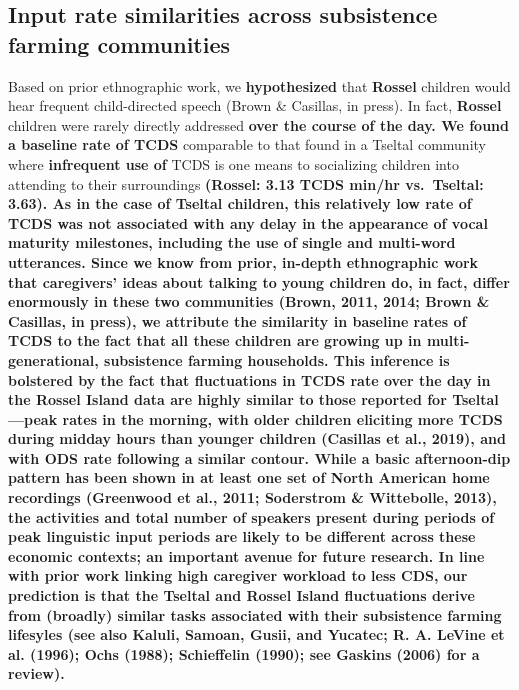 \documentclass[,man,floatsintext]{apa6}
\begin{document}
\subsection{\texorpdfstring{\textbf{Input rate similarities across
subsistence farming
communities}}{Input rate similarities across subsistence farming communities}}\label{input-rate-similarities-across-subsistence-farming-communities}

Based on prior ethnographic work, we \textbf{hypothesized} that
\textbf{Rossel} children would hear frequent child-directed speech
(Brown \& Casillas, in press). In fact, \textbf{Rossel} children were
rarely directly addressed \textbf{over the course of the day. We found a
baseline rate of TCDS} comparable to that found in a Tseltal community
where \textbf{infrequent use of} TCDS is one means to socializing
children into attending to their surroundings \textbf{(Rossel: 3.13 TCDS
min/hr vs.~Tseltal: 3.63). As in the case of Tseltal children, this
relatively low rate of TCDS was not associated with any delay in the
appearance of vocal maturity milestones, including the use of single and
multi-word utterances. Since we know from prior, in-depth ethnographic
work that caregivers' ideas about talking to young children do, in fact,
differ enormously in these two communities (Brown, 2011, 2014; Brown \&
Casillas, in press), we attribute the similarity in baseline rates of
TCDS to the fact that all these children are growing up in
multi-generational, subsistence farming households. This inference is
bolstered by the fact that fluctuations in TCDS rate over the day in the
Rossel Island data are highly similar to those reported for
Tseltal---peak rates in the morning, with older children eliciting more
TCDS during midday hours than younger children (Casillas et al., 2019),
and with ODS rate following a similar contour. While a basic
afternoon-dip pattern has been shown in at least one set of North
American home recordings (Greenwood et al., 2011; Soderstrom \&
Wittebolle, 2013), the activities and total number of speakers present
during periods of peak linguistic input periods are likely to be
different across these economic contexts; an important avenue for future
research. In line with prior work linking high caregiver workload to
less CDS, our prediction is that the Tseltal and Rossel Island
fluctuations derive from (broadly) similar tasks associated with their
subsistence farming lifesyles (see also Kaluli, Samoan, Gusii, and
Yucatec; R. A. LeVine et al. (1996); Ochs (1988); Schieffelin (1990);
see Gaskins (2006) for a review).}
\end{document}
